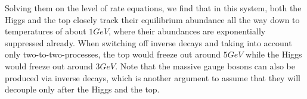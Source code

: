 Solving them on the level of rate equations, we find that in this system, both the Higgs and the top closely track their equilibrium abundance all the way down to temperatures of about $\unit{1}{GeV}$, where their abundances are exponentially suppressed already. When switching off inverse decays and taking into account only two-to-two-processes, the top would freeze out around $\unit{5}{GeV}$ while the Higgs would freeze out around $\unit{3}{GeV}$. Note that the massive gauge bosons can also be produced via inverse decays, which is another argument to assume that they will decouple only after the Higgs and the top.
